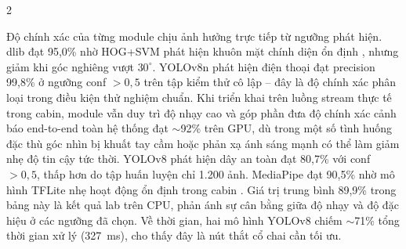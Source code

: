\documentclass[10pt]{article}
\begin{document}
\begin{multicols}{2}
\noindent
\begin{minipage}{\columnwidth}
\centering
{}
\label{fig:inference_time}
\end{minipage}
\vspace{6pt}

Độ chính xác của từng module chịu ảnh hưởng trực tiếp từ ngưỡng phát hiện. dlib đạt 95,0\% nhờ HOG+SVM phát hiện khuôn mặt chính diện ổn định \cite{king2009}, nhưng giảm khi góc nghiêng vượt $30^\circ$. YOLOv8n phát hiện điện thoại đạt precision 99,8\% ở ngưỡng conf $>0{,}5$ trên tập kiểm thử cô lập -- đây là độ chính xác phân loại trong điều kiện thử nghiệm chuẩn. Khi triển khai trên luồng stream thực tế trong cabin, module vẫn duy trì độ nhạy cao và góp phần đưa độ chính xác cảnh báo end-to-end toàn hệ thống đạt $\sim$92\% trên GPU, dù trong một số tình huống đặc thù góc nhìn bị khuất tay cầm hoặc phản xạ ánh sáng mạnh có thể làm giảm nhẹ độ tin cậy tức thời. YOLOv8 phát hiện dây an toàn đạt 80,7\% với conf $>0{,}5$, thấp hơn do tập huấn luyện chỉ 1.200 ảnh. MediaPipe đạt 90,5\% nhờ mô hình TFLite nhẹ hoạt động ổn định trong cabin \cite{lugaresi2019}. Giá trị trung bình 89,9\% trong bảng này là kết quả lab trên CPU, phản ánh sự cân bằng giữa độ nhạy và độ đặc hiệu ở các ngưỡng đã chọn. Về thời gian, hai mô hình YOLOv8 chiếm $\sim$71\% tổng thời gian xử lý (327~ms), cho thấy đây là nút thắt cổ chai cần tối ưu.


\end{multicols}
\end{document}

